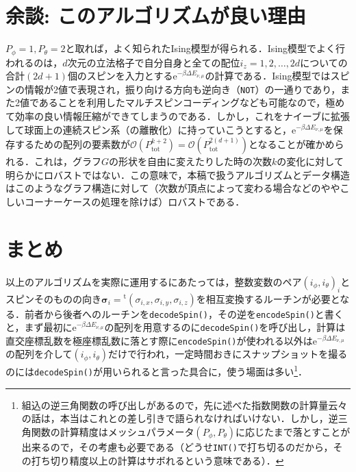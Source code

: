 \documentclass[a4,10pt, platex, dvipdfmx]{jsarticle}
\newcommand{\spin}{\bm{\sigma}}
\begin{document}
    \section{余談: このアルゴリズムが良い理由}
    $P_{\phi} = 1, P_{\theta} = 2$と取れば，よく知られたIsing模型が得られる．Ising模型でよく行われるのは，$d$次元の立法格子で自分自身と全ての配位$i_{z} = 1, 2, \dots, 2d$についての合計$(2d+1)$個のスピンを入力とする$\mathrm{e}^{-\beta \Delta E_{\nu, \mu}}$の計算である．Ising模型ではスピンの情報が2値で表現され，振り向ける方向も逆向き（\texttt{NOT}）の一通りであり，また2値であることを利用したマルチスピンコーディングなども可能なので，極めて効率の良い情報圧縮ができてしまうのである．しかし，これをナイーブに拡張して球面上の連続スピン系（の離散化）に持っていこうとすると，$\mathrm{e}^{-\beta \Delta E_{\nu, \mu}}$を保存するための配列の要素数が$\mathcal{O}(P_{\mathrm{tot}}^{k + 2}) = \mathcal{O}(P_{\mathrm{tot}}^{2(d + 1)})$となることが確かめられる．これは，グラフ$G$の形状を自由に変えたりした時の次数$k$の変化に対して明らかにロバストではない．この意味で，本稿で扱うアルゴリズムとデータ構造はこのようなグラフ構造に対して（次数が頂点によって変わる場合などのややこしいコーナーケースの処理を除けば）ロバストである．

    \section{まとめ}
    以上のアルゴリズムを実際に運用するにあたっては，整数変数のペア$ \left(i_{\phi}, i_{\theta}\right)_{i} $とスピンそのものの向き$\spin_{i} = {}^{\mathrm{t}}\left(\sigma_{i, x}, \sigma_{i, y}, \sigma_{i, z}\right) $を相互変換するルーチンが必要となる．前者から後者へのルーチンを\texttt{decodeSpin()}，その逆を\texttt{encodeSpin()}と書くと，まず最初に$\mathrm{e}^{-\beta \Delta E_{\nu, \mu}}$の配列を用意するのに\texttt{decodeSpin()}を呼び出し，計算は直交座標乱数を極座標乱数に落とす際に\texttt{encodeSpin()}が使われる以外は$\mathrm{e}^{-\beta \Delta E_{\nu, \mu}}$の配列を介して$ \left(i_{\phi}, i_{\theta}\right) $だけで行われ，一定時間おきにスナップショットを撮るのには\texttt{decodeSpin()}が用いられると言った具合に，使う場面は多い\footnote{組込の逆三角関数の呼び出しがあるので，先に述べた指数関数の計算量云々の話は，本当はこれとの差し引きで語られなければいけない．しかし，逆三角関数の計算精度はメッシュパラメータ$\left(P_{\phi}, P_{\theta}\right)$に応じたまで落とすことが出来るので，その考慮も必要である（どうせ\texttt{INT()}で打ち切るのだから，その打ち切り精度以上の計算はサボれるという意味である）．}．

    \printbibliography
\end{document}
